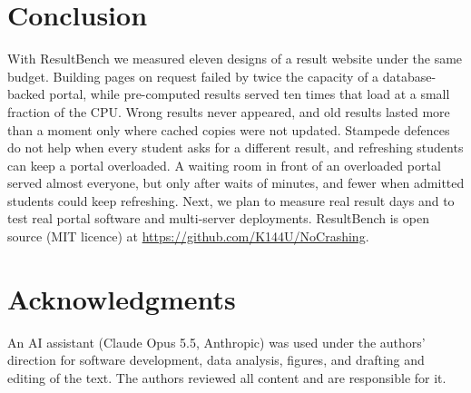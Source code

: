 \section{Conclusion}

With ResultBench we measured eleven designs of a result website under the same
budget. Building pages on request failed by twice the capacity of a
database-backed portal, while pre-computed results served ten times that load
at a small fraction of the CPU. Wrong results never appeared, and old results
lasted more than a moment only where cached copies were not updated. Stampede defences do not
help when every student asks for a different result, and refreshing students
can keep a portal overloaded. A waiting room in front of an overloaded portal
served almost everyone, but only after waits of minutes, and fewer when
admitted students could keep refreshing. Next, we plan to measure real result days and to test
real portal software and multi-server deployments. ResultBench is open source
(MIT licence) at \url{https://github.com/K144U/NoCrashing}.

\section*{Acknowledgments}

An AI assistant (Claude Opus 5.5, Anthropic) was used under the authors'
direction for software development, data analysis, figures, and drafting and
editing of the text. The authors reviewed all content and are responsible for
it.
